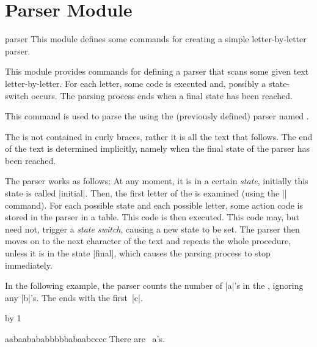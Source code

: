 %
%
%


\section{Parser Module}
\label{section-module-parser}

\begin{pgfmodule}{parser}
    This module defines some commands for creating a simple letter-by-letter
    parser.
\end{pgfmodule}

This module provides commands for defining a parser that scans some given text
letter-by-letter. For each letter, some code is executed and, possibly a
state-switch occurs. The parsing process ends when a final state has been
reached.

\begin{command}{\pgfparserparse{}}
    This command is used to parse the  using the (previously
    defined) parser named .

    The  is not contained in curly braces, rather it is all the text
    that follows. The end of the text is determined implicitly, namely when the
    final state of the parser has been reached.

    The parser works as follows: At any moment, it is in a certain
    \emph{state}, initially this state is called |initial|. Then, the first
    letter of the  is examined (using the |\futurlet| command). For
    each possible state and each possible letter, some action code is stored in
    the parser in a table. This code is then executed. This code may, but need
    not, trigger a \emph{state switch}, causing a new state to be set. The
    parser then moves on to the next character of the text and repeats the
    whole procedure, unless it is in the state |final|, which causes the
    parsing process to stop immediately.

    In the following example, the parser counts the number of |a|'s in the
    , ignoring any |b|'s. The  ends with the first~|c|.
\begin{codeexample}[]
\newcount\mycount
{}
{\advance\mycount by 1\relax}
{} %
{}%

aabaabababbbbbabaabcccc
There are \the\mycount\ a's.
\end{codeexample}
\end{command}

